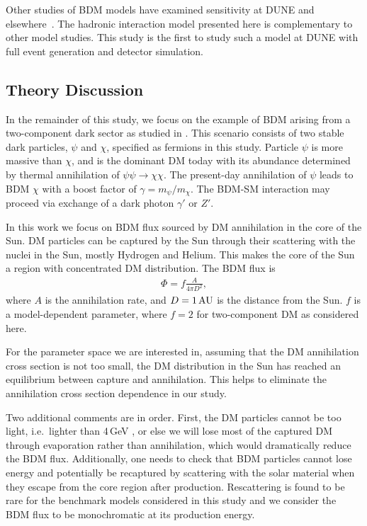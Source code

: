 Other studies of BDM models have examined sensitivity at DUNE and elsewhere~\cite{Agashe:2014yua,Berger:2014sqa,Alhazmi:2016qcs,Necib:2016aez,Kim:2016zjx,Kachulis:2017nci,Giudice:2017zke,Chatterjee:2018mej,Kim:2018veo}. The hadronic interaction model presented here is complementary to other model studies. This study is the first to study such a model at DUNE with full event generation and detector simulation.

\subsection{\label{sec:level2}Theory Discussion}
In the remainder of this study, we focus on the example of BDM arising from a two-component dark sector as studied in \cite{Agashe:2014yua, Berger:2014sqa}. This scenario consists of two stable dark particles, $\psi$ and $\chi$, specified as fermions in this study. Particle $\psi$ is more massive than $\chi$, and is the dominant DM today with its abundance determined by thermal annihilation of $\psi\psi\rightarrow\chi\chi$. The present-day annihilation of $\psi$ leads to BDM $\chi$ with a boost factor of $\gamma = m_\psi/m_\chi$. The BDM-SM interaction may proceed via exchange of a dark photon $\gamma'$ or $Z'$.

In this work we focus on BDM flux sourced by DM annihilation in the core of the Sun. DM particles can be captured by the Sun through their scattering with the nuclei in the Sun, mostly Hydrogen and Helium. This makes the core of the Sun a region with concentrated DM distribution. The BDM flux is
\begin{eqnarray} \label{eq:flux}
\Phi= f \frac{A}{4\pi D^2},
\end{eqnarray}
where $A$ is the annihilation rate, and $D = 1\,\rm{AU}$ is the distance from the Sun. $f$ is a model-dependent parameter, where $f = 2$ for two-component DM as considered here.

For the parameter space we are interested in, assuming that the 
DM annihilation cross section is not too small, the DM distribution in the Sun has reached an equilibrium between capture and annihilation. This helps to eliminate the annihilation cross section dependence in our study.

Two additional comments are in order. First, the DM particles cannot be too light, i.e.\ lighter than 4\,GeV \cite{Griest:1986yu,Gould:1987ju}, or else we will lose most of the captured DM through evaporation rather than annihilation, which would dramatically reduce the BDM flux. Additionally, one needs to check that BDM particles cannot lose energy and potentially be recaptured by scattering with the solar material when they escape from the core region after production. Rescattering is found to be rare for the benchmark models considered in this study and we consider the BDM flux to be monochromatic at its production energy.

